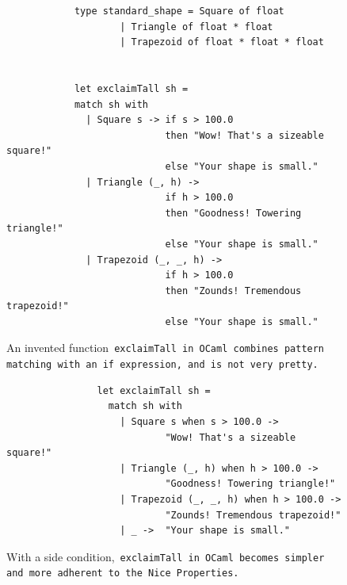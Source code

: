 \documentclass[manuscript,screen,12pt, nonacm]{acmart}
\begin{document}
        \begin{figure}[ht]
        \begin{verbatim}
            type standard_shape = Square of float 
                    | Triangle of float * float
                    | Trapezoid of float * float * float
                    

            let exclaimTall sh =
            match sh with 
              | Square s -> if s > 100.0 
                            then "Wow! That's a sizeable square!"
                            else "Your shape is small." 
              | Triangle (_, h) -> 
                            if h > 100.0 
                            then "Goodness! Towering triangle!"
                            else "Your shape is small." 
              | Trapezoid (_, _, h) -> 
                            if h > 100.0
                            then "Zounds! Tremendous trapezoid!"
                            else "Your shape is small." 
            \end{verbatim}    
        \caption{An invented function~\tt{exclaimTall} in OCaml combines pattern
        matching with an~\tt{if} expression, and is not very pretty.}   
        \label{fig:ifexclaimtall}
    \end{figure}


       \begin{figure}[]
            \begin{verbatim}
                let exclaimTall sh =
                  match sh with 
                    | Square s when s > 100.0 ->
                            "Wow! That's a sizeable square!"
                    | Triangle (_, h) when h > 100.0 ->
                            "Goodness! Towering triangle!"
                    | Trapezoid (_, _, h) when h > 100.0 -> 
                            "Zounds! Tremendous trapezoid!"
                    | _ ->  "Your shape is small." 
                \end{verbatim}
            \caption{With a side condition,~\tt{exclaimTall} in OCaml becomes
            simpler and more adherent to the Nice~Properties.} 
            \label{fig:whenexclaimtall}
        \end{figure}
\end{document}
